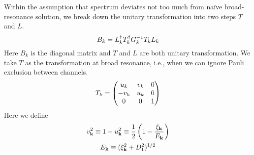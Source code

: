 Within the assumption that spectrum  deviates not too much from na\"{i}ve broad-resonance solution, we  break down the unitary transformation into two steps $T$ and $L$. 
\begin{equation}\label{eq:pathInt2:B}
B_k=L_k^{\dagger}T_k^{\dagger}G_k^{-1}T_kL_k
\end{equation} 
Here $B_{k}$ is the diagonal matrix and $T$ and $L$ are both unitary transformation.  We take $T$ as the transformation at broad resonance, i.e., when we can ignore Pauli exclusion between channels. 
\begin{equation}
T_k=\begin{pmatrix}u_k&v_k&0\\-v_k&u_k&0\\0&0&1\end{pmatrix}
\end{equation}
Here we define 
\begin{gather}
v_{\mathbf{k}}^{2}\equiv1-u_{\mathbf{k}}^{2}\equiv\frac{1}{2}\left(1-\frac{\xi_{\mathbf{k}}}{E_{\mathbf{k}}}\right)\\
E_{\mathbf{k}}\equiv(\xi_{\mathbf{k}}^{2}+D_{1}^{2})^{1/2}
\end{gather}

